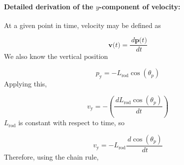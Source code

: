 \documentclass[12pt]{article}
\begin{document}
\paragraph{Detailed derivation of the $y$-component of velocity:}
\label{GD:velocityIYDeriv}
At a given point in time, velocity may be defined as

\begin{displaymath}
\symbf{v}\text{(}t\text{)}=\frac{\,d\symbf{p}\text{(}t\text{)}}{\,dt}
\end{displaymath}
We also know the vertical position

\begin{displaymath}
{p_{\text{y}}}=-{L_{\text{rod}}} \cos\left({θ_{p}}\right)
\end{displaymath}
Applying this,

\begin{displaymath}
{v_{\text{y}}}=-\left(\frac{\,d{L_{\text{rod}}} \cos\left({θ_{p}}\right)}{\,dt}\right)
\end{displaymath}
${L_{\text{rod}}}$ is constant with respect to time, so

\begin{displaymath}
{v_{\text{y}}}=-{L_{\text{rod}}} \frac{\,d\cos\left({θ_{p}}\right)}{\,dt}
\end{displaymath}
Therefore, using the chain rule,
\end{document}
